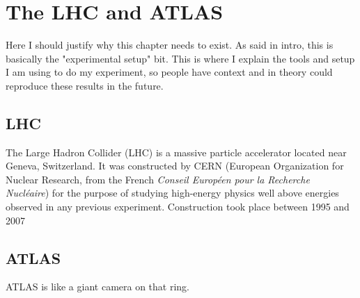 \chapter{The LHC and ATLAS}\label{chapter:experiment}

Here I should justify why this chapter needs to exist. As said in intro, this is basically the "experimental setup" bit. This is where I explain the tools and setup I am using to do my experiment, so people have context and in theory could reproduce these results in the future.


\section{LHC}

The Large Hadron Collider (LHC) is a massive particle accelerator located near Geneva, Switzerland.
It was constructed by CERN (European Organization for Nuclear Research, from the French \textit{Conseil Européen pour la Recherche Nucléaire}) for the purpose of studying high-energy physics well above energies observed in any previous experiment.
Construction took place between 1995 and 2007




\section{ATLAS}

ATLAS is like a giant camera on that ring.

